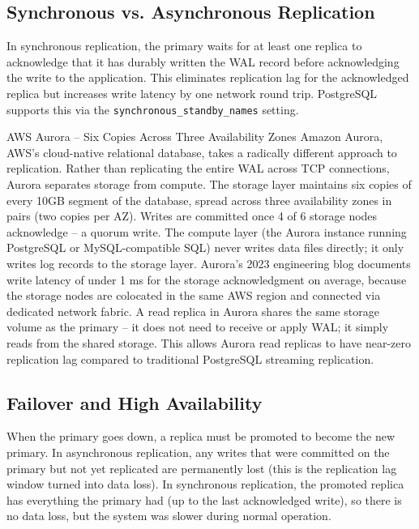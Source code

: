 \documentclass[11pt,a4paper]{article}
\begin{document}
\subsection{Synchronous vs. Asynchronous Replication}

In synchronous replication, the primary waits for at least one replica to acknowledge that it has durably written the WAL record before acknowledging the write to the application. This eliminates replication lag for the acknowledged replica but increases write latency by one network round trip. PostgreSQL supports this via the \texttt{synchronous\_standby\_names} setting.

\begin{industrybox}{AWS Aurora -- Six Copies Across Three Availability Zones}
Amazon Aurora, AWS's cloud-native relational database, takes a radically different approach to replication. Rather than replicating the entire WAL across TCP connections, Aurora separates storage from compute. The storage layer maintains six copies of every 10GB segment of the database, spread across three availability zones in pairs (two copies per AZ). Writes are committed once 4 of 6 storage nodes acknowledge -- a quorum write. The compute layer (the Aurora instance running PostgreSQL or MySQL-compatible SQL) never writes data files directly; it only writes log records to the storage layer. Aurora's 2023 engineering blog documents write latency of under 1 ms for the storage acknowledgment on average, because the storage nodes are colocated in the same AWS region and connected via dedicated network fabric. A read replica in Aurora shares the same storage volume as the primary -- it does not need to receive or apply WAL; it simply reads from the shared storage. This allows Aurora read replicas to have near-zero replication lag compared to traditional PostgreSQL streaming replication.
\end{industrybox}

\subsection{Failover and High Availability}

When the primary goes down, a replica must be promoted to become the new primary. In asynchronous replication, any writes that were committed on the primary but not yet replicated are permanently lost (this is the replication lag window turned into data loss). In synchronous replication, the promoted replica has everything the primary had (up to the last acknowledged write), so there is no data loss, but the system was slower during normal operation.
\end{document}
